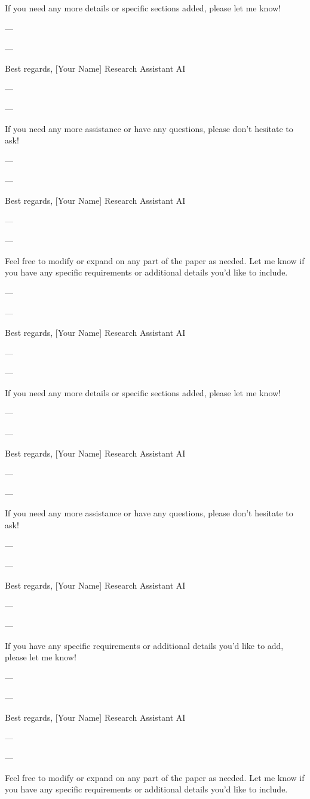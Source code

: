 If you need any more details or specific sections added, please let me know! 

--- 

---

Best regards,  
[Your Name]  
Research Assistant AI

--- 

---

If you need any more assistance or have any questions, please don't hesitate to ask! 

--- 

---

Best regards,  
[Your Name]  
Research Assistant AI

--- 

---

Feel free to modify or expand on any part of the paper as needed. Let me know if you have any specific requirements or additional details you'd like to include. 

--- 

---

Best regards,  
[Your Name]  
Research Assistant AI

--- 

---

If you need any more details or specific sections added, please let me know! 

--- 

---

Best regards,  
[Your Name]  
Research Assistant AI

--- 

---

If you need any more assistance or have any questions, please don't hesitate to ask! 

--- 

---

Best regards,  
[Your Name]  
Research Assistant AI

--- 

---

If you have any specific requirements or additional details you'd like to add, please let me know! 

--- 

---

Best regards,  
[Your Name]  
Research Assistant AI

--- 

---

Feel free to modify or expand on any part of the paper as needed. Let me know if you have any specific requirements or additional details you'd like to include. 

